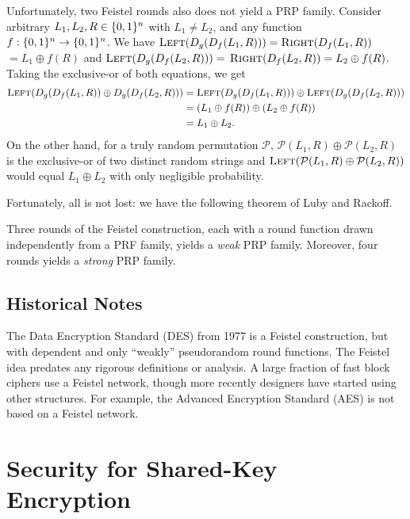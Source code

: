 \documentclass[11pt]{article}
\begin{document}
Unfortunately, two Feistel rounds also does not yield a PRP family.
Consider arbitrary $L_1, L_2, R \in \{0,1\}^n$ with $L_{1} \neq L_{2}$,
and any function $f : \{0,1\}^n \rightarrow \{0,1\}^n$.  We have
$\textsc{Left}(D_g( D_f(L_1,R) )) = \textsc{Right}( D_f(L_1,R) )$
$= L_1\oplus f(R)$ and $\textsc{Left}(D_g( D_f(L_2,R) )) = $
$\textsc{Right}( D_f(L_2,R) )= L_2\oplus f(R)$. Taking the 
exclusive-or of both equations, we get 
\begin{align*}
\textsc{Left}(D_g( D_f(L_1,R) ) \oplus D_g( D_f(L_2,R) )) &=
\textsc{Left}(D_g( D_f(L_1,R) ))\oplus\textsc{Left}(D_g( D_f(L_2,R) ))\\
&= (L_1\oplus f(R)) \oplus (L_2\oplus f(R))\\
&= L_1 \oplus L_2.
\end{align*}
On the other 
hand, for a truly random permutation $\mathcal P$, $\mathcal P(L_1,R)
\oplus \mathcal P(L_2, R)$ is the exclusive-or of two distinct random
strings and $\textsc{Left}(\mathcal P(L_1,R)
\oplus \mathcal P(L_2, R))$ would equal $L_1\oplus L_2$ with only
negligible probability.

Fortunately, all is not lost: we have the following theorem of Luby
and Rackoff.

\begin{theorem}
  \label{thm:luby-rackoff}
  Three rounds of the Feistel construction, each with a round function
  drawn independently from a  PRF family, yields a \emph{weak} PRP
  family.  Moreover, four rounds yields a \emph{strong} PRP family.
\end{theorem}

\subsection{Historical Notes}
\label{sec:historical-notes}

The Data Encryption Standard (DES) from 1977 is a Feistel
construction, but with dependent and only ``weakly'' pseudorandom
round functions.  The Feistel idea predates any rigorous definitions
or analysis.  A large fraction of fast block ciphers use a Feistel
network, though more recently designers have started using other
structures.  For example, the Advanced Encryption Standard (AES) is
not based on a Feistel network.

\section{Security for Shared-Key Encryption}
\label{sec:security-shared-key}
\end{document}
